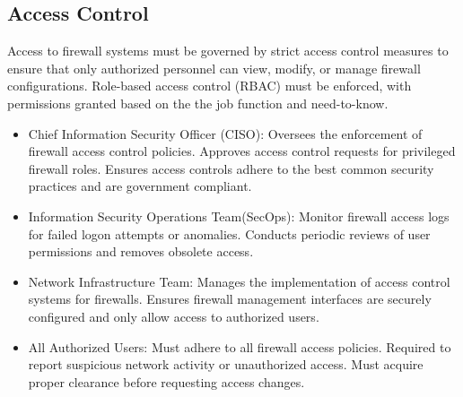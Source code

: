     \subsection{Access Control}
    Access to firewall systems must be governed by strict access control measures to ensure that only authorized personnel can view, modify, or manage firewall configurations. Role-based access control (RBAC) must be enforced, with permissions granted based on the the job function and need-to-know.
\begin{itemize}
    \item Chief Information Security Officer (CISO): Oversees the enforcement of firewall access control policies. Approves access control requests for privileged firewall roles. Ensures access controls adhere to the best common security practices and are government compliant.

    
    \item Information Security Operations Team(SecOps): Monitor firewall access logs for failed logon attempts or anomalies. Conducts periodic reviews of user permissions and removes obsolete access.

    
    \item Network Infrastructure Team: Manages the implementation of access control systems for firewalls. Ensures firewall management interfaces are securely configured and only allow access to authorized users.

    
    \item All Authorized Users: Must adhere to all firewall access policies. Required to report suspicious network activity or unauthorized access. Must acquire proper clearance before requesting access changes.

\end{itemize}
